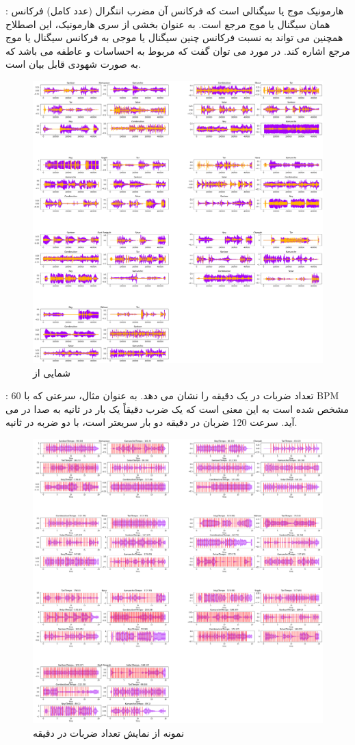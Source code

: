 \documentclass{article}
\begin{document}
:\newline
هارمونیک موج یا سیگنالی است که فرکانس آن مضرب انتگرال (عدد کامل) فرکانس همان سیگنال یا موج مرجع است. به عنوان بخشی از سری هارمونیک، این اصطلاح همچنین می تواند به نسبت فرکانس چنین سیگنال یا موجی به فرکانس سیگنال یا موج مرجع اشاره کند.\newline
در مورد  می توان گفت که مربوط به احساسات و عاطفه می باشد که به صورت شهودی قابل بیان است.
\begin{figure}[h]
	\centering
	\includegraphics[width=0.5\linewidth]{Photo/27}
	\caption[شمایی از ]{شمایی از }
	\label{fig:27}
\end{figure}


 :\newline
تعداد ضربات در یک دقیقه را نشان می دهد. به عنوان مثال، سرعتی که با 60 BPM مشخص شده است به این معنی است که یک ضرب دقیقاً یک بار در ثانیه به صدا در می آید. سرعت 120 ضربان در دقیقه دو بار سریعتر است، با دو ضربه در ثانیه.
\begin{figure}[h]
	\centering
	\includegraphics[width=0.5\linewidth]{Photo/28}
	\caption[نمونه از نمایش تعداد ضربات در دقیقه]{نمونه از نمایش تعداد ضربات در دقیقه}
	\label{fig:28}
\end{figure}
\end{document}

